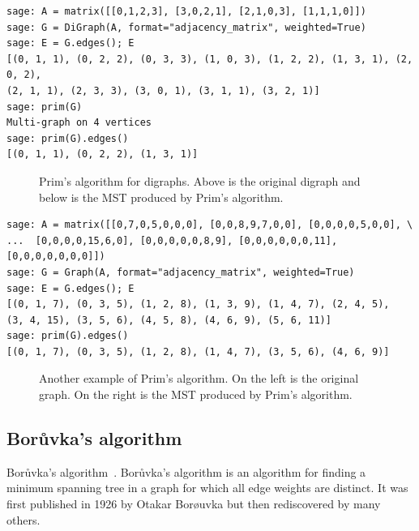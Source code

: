 \begin{lstlisting}
sage: A = matrix([[0,1,2,3], [3,0,2,1], [2,1,0,3], [1,1,1,0]])
sage: G = DiGraph(A, format="adjacency_matrix", weighted=True)
sage: E = G.edges(); E
[(0, 1, 1), (0, 2, 2), (0, 3, 3), (1, 0, 3), (1, 2, 2), (1, 3, 1), (2, 0, 2),
(2, 1, 1), (2, 3, 3), (3, 0, 1), (3, 1, 1), (3, 2, 1)]
sage: prim(G)
Multi-graph on 4 vertices
sage: prim(G).edges()
[(0, 1, 1), (0, 2, 2), (1, 3, 1)]
\end{lstlisting}

\begin{figure}[!htbp]
\centering

\caption{Prim's algorithm for digraphs. Above is the original digraph
  and below is the MST produced by Prim's algorithm.}
\label{fig:tree-forests:Prim_algorithm_digraph}
\end{figure}

\begin{lstlisting}
sage: A = matrix([[0,7,0,5,0,0,0], [0,0,8,9,7,0,0], [0,0,0,0,5,0,0], \
...  [0,0,0,0,15,6,0], [0,0,0,0,0,8,9], [0,0,0,0,0,0,11], [0,0,0,0,0,0,0]])
sage: G = Graph(A, format="adjacency_matrix", weighted=True)
sage: E = G.edges(); E
[(0, 1, 7), (0, 3, 5), (1, 2, 8), (1, 3, 9), (1, 4, 7), (2, 4, 5),
(3, 4, 15), (3, 5, 6), (4, 5, 8), (4, 6, 9), (5, 6, 11)]
sage: prim(G).edges()
[(0, 1, 7), (0, 3, 5), (1, 2, 8), (1, 4, 7), (3, 5, 6), (4, 6, 9)]
\end{lstlisting}

\begin{figure}[!htbp]
\centering

\caption{Another example of Prim's algorithm. On the left is the
  original graph. On the right is the MST produced by Prim's algorithm.}
\label{fig:tree-forests:Prim_algorithm_digraph2}
\end{figure}



\subsection{Bor\r{u}vka's algorithm}
\label{subsec:trees_forests:Boruvka_algorithm}

Bor\r{u}vka's
algorithm~\cite{Boruvka1926a,Boruvka1926b}. Bor\r{u}vka's algorithm is
an algorithm for finding a minimum spanning tree in a graph for which
all edge weights are distinct. It was first published in 1926 by
Otakar Bor\o uvka but then rediscovered by many others.

